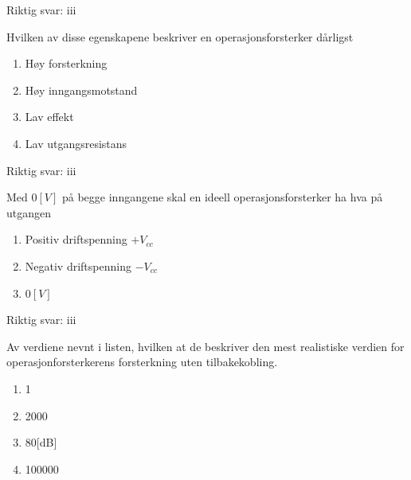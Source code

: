 \begin{solution}[name=Løsningsforslag oppgave]
	Riktig svar: iii

\end{solution}
\vspace{0.5cm} %
\begin{question}[name=Oppgave, topic=operasjonsforsterker]
	Hvilken av disse egenskapene beskriver en operasjonsforsterker dårligst
	\begin{enumerate}[label=\roman*)]
		\item Høy forsterkning
		\item Høy inngangsmotstand
		\item Lav effekt
		\item Lav utgangsresistans
	\end{enumerate}
\end{question}

\begin{solution}[name=Løsningsforslag oppgave]
	Riktig svar: iii

\end{solution}
\vspace{0.5cm} %
\begin{question}[name=Oppgave, topic=operasjonsforsterker]
	Med $0[V]$ på begge inngangene skal en ideell operasjonsforsterker ha hva på utgangen
	\begin{enumerate}[label=\roman*)]
		\item Positiv driftspenning $+V_{cc}$
		\item Negativ driftspenning $-V_{cc}$
		\item $0[V]$
	\end{enumerate}
\end{question}

\begin{solution}[name=Løsningsforslag oppgave]
	Riktig svar: iii

\end{solution}
\vspace{0.5cm} %
\begin{question}[name=Oppgave, topic=operasjonsforsterker]
	Av verdiene nevnt i listen, hvilken at de beskriver den mest realistiske verdien for operasjonforsterkerens forsterkning uten tilbakekobling.
	\begin{enumerate}[label=\roman*)]
		\item 1
		\item 2000
		\item 80[dB]
		\item 100000
	\end{enumerate}
\end{question}

